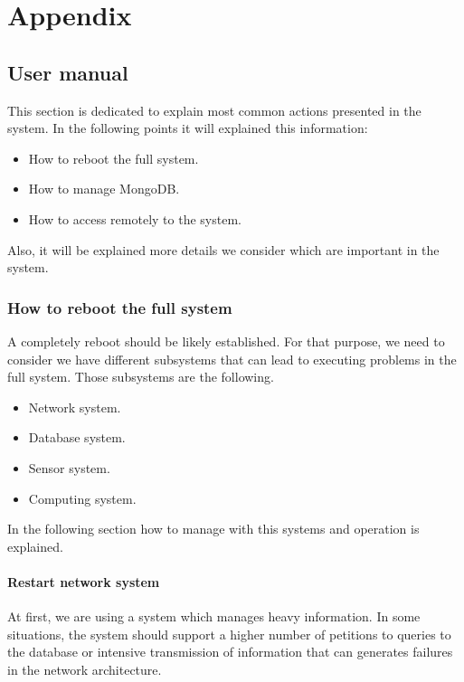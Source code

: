 
\chapter{Appendix}

\section{User manual}
This section is dedicated to explain most common actions presented in the system. In the following points it will explained this information:

\begin{itemize}
\item How to reboot the full system.
\item How to manage MongoDB.
\item How to access remotely to the system.
\end{itemize}

Also, it will be explained more details we consider which are important in the system.\\

\subsection{How to reboot the full system}

A completely reboot should be likely established. For that purpose, we need to consider we have different subsystems that can lead to executing problems in the full system. Those subsystems are the following.

\begin{itemize}
\item Network system.
\item Database system.
\item Sensor system.
\item Computing system.
\end{itemize}

In the following section how to manage with this systems and operation is explained.\\

\subsubsection{Restart network system}

At first, we are using a system which manages heavy information. In some situations, the system should support a higher number of petitions to queries to the database or intensive transmission of information that can generates failures in the network architecture.\\

